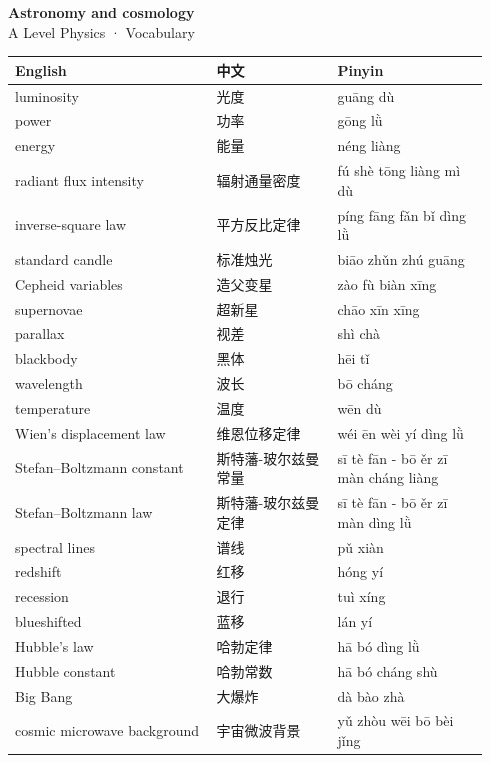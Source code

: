 \documentclass[11pt]{article}
\begin{document}
\begin{center}
  {\LARGE\bfseries Astronomy and cosmology}\\[0.35em]
  {\large A Level Physics · Vocabulary}
\end{center}
\vspace{0.6em}

\begin{longtable}{@{}p{0.40\linewidth}p{0.24\linewidth}p{0.30\linewidth}@{}}
\toprule
\textbf{English} & \textbf{中文} & \textbf{Pinyin} \\
\midrule
\endhead
\bottomrule
\endlastfoot
luminosity & 光度 & guāng dù \\
power & 功率 & gōng lǜ \\
energy & 能量 & néng liàng \\
radiant flux intensity & 辐射通量密度 & fú shè tōng liàng mì dù \\
inverse-square law & 平方反比定律 & píng fāng fǎn bǐ dìng lǜ \\
standard candle & 标准烛光 & biāo zhǔn zhú guāng \\
Cepheid variables & 造父变星 & zào fù biàn xīng \\
supernovae & 超新星 & chāo xīn xīng \\
parallax & 视差 & shì chà \\
blackbody & 黑体 & hēi tǐ \\
wavelength & 波长 & bō cháng \\
temperature & 温度 & wēn dù \\
Wien's displacement law & 维恩位移定律 & wéi ēn wèi yí dìng lǜ \\
Stefan–Boltzmann constant & 斯特藩-玻尔兹曼常量 & sī tè fān - bō ěr zī màn cháng liàng \\
Stefan–Boltzmann law & 斯特藩-玻尔兹曼定律 & sī tè fān - bō ěr zī màn dìng lǜ \\
spectral lines & 谱线 & pǔ xiàn \\
redshift & 红移 & hóng yí \\
recession & 退行 & tuì xíng \\
blueshifted & 蓝移 & lán yí \\
Hubble's law & 哈勃定律 & hā bó dìng lǜ \\
Hubble constant & 哈勃常数 & hā bó cháng shù \\
Big Bang & 大爆炸 & dà bào zhà \\
cosmic microwave background & 宇宙微波背景 & yǔ zhòu wēi bō bèi jǐng \\
\end{longtable}
\end{document}
